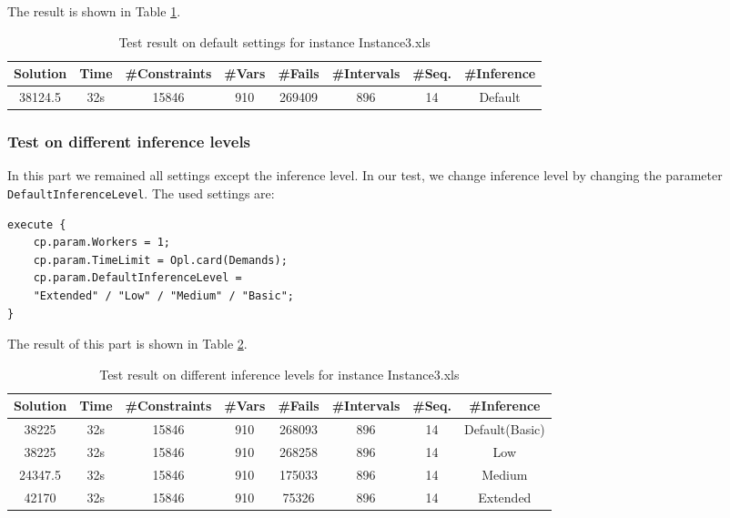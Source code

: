 \documentclass[a4paper, 12pt]{article}
\begin{document}
The result is shown in Table \ref{default3}. 

\begin{table}
    \centering
    \caption{Test result on default settings for instance Instance3.xls}
    \label{default3}
    \begin{tabular}{|c|c|c|c|c|c|c|c|}
        \hline
        Solution & Time & \#Constraints & \#Vars & \#Fails & \#Intervals & \#Seq. & \#Inference \\
        \hline
        38124.5 & 32s & 15846 & 910 & 269409 & 896 & 14 & Default \\
        \hline
    \end{tabular}
\end{table}

\subsubsection{Test on different inference levels}

In this part we remained all settings except the inference level. In our test, we change inference level by changing the parameter \texttt{DefaultInferenceLevel}. The used settings are: 

\begin{lstlisting}
execute {
    cp.param.Workers = 1;
    cp.param.TimeLimit = Opl.card(Demands); 
    cp.param.DefaultInferenceLevel = 
    "Extended" / "Low" / "Medium" / "Basic";
}
\end{lstlisting}

The result of this part is shown in Table \ref{diffInfer3}. 

\begin{table}
    \centering
    \caption{Test result on different inference levels for instance Instance3.xls}
    \label{diffInfer3}
    \begin{tabular}{|c|c|c|c|c|c|c|c|}
        \hline
        Solution & Time & \#Constraints & \#Vars & \#Fails & \#Intervals & \#Seq. & \#Inference \\
        \hline
        38225 & 32s & 15846 & 910 & 268093 & 896 & 14 & Default(Basic) \\
        \hline 
        38225 & 32s & 15846 & 910 & 268258 & 896 & 14 & Low \\
        \hline
        24347.5 & 32s & 15846 & 910 & 175033 & 896 & 14 & Medium \\
        \hline
        42170 & 32s & 15846 & 910 & 75326 & 896 & 14 & Extended \\
        \hline
    \end{tabular}
\end{table}
\end{document}
